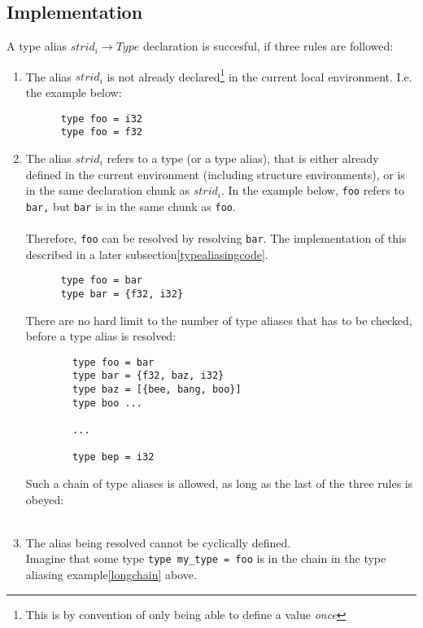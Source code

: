 \subsection{Implementation}\label{typealiasimplementation}
A type alias $strid_i \to Type$ declaration is succesful, if three rules are followed:
\begin{enumerate}
  \item The alias $strid_i$ is not already declared\footnote{This is by convention of
      only being able to define a value \textit{once}} in the current local
    environment. I.e. the example below:
    \begin{verbatim}
      type foo = i32
      type foo = f32
    \end{verbatim}
\clearpage
  \item The alias $strid_i$ refers to a type (or a type alias), that is either already
    defined in the current environment (including structure environments), or is
    in the same declaration chunk as $strid_i$. In the example below, \texttt{foo} refers
    to \texttt{bar,} but \texttt{bar} is in the same chunk as \texttt{foo}.\\
    \\
    Therefore, \texttt{foo} can be resolved by resolving \texttt{bar}. The implementation of this
    described in a later subsection\ref{typealiasingcode}.
    \begin{verbatim} 
      type foo = bar
      type bar = {f32, i32}
    \end{verbatim}
    There are no hard limit to the number of type aliases that has to be
    checked, before a type alias is resolved:
    \label{longchain}
      \begin{verbatim}
        type foo = bar
        type bar = {f32, baz, i32}
        type baz = [{bee, bang, boo}]
        type boo ...
  
        ...
  
        type bep = i32
        \end{verbatim}
    Such a chain of type aliases is allowed, as long as the last of the three
    rules is obeyed:
    \\
    \\
  \item The alias being resolved cannot be cyclically defined.\label{cyclicaldefinitionerror}\\
    Imagine that some type \texttt{type my\_type = foo} is in the chain in the
    type aliasing example\ref{longchain} above.\\


\end{enumerate}

